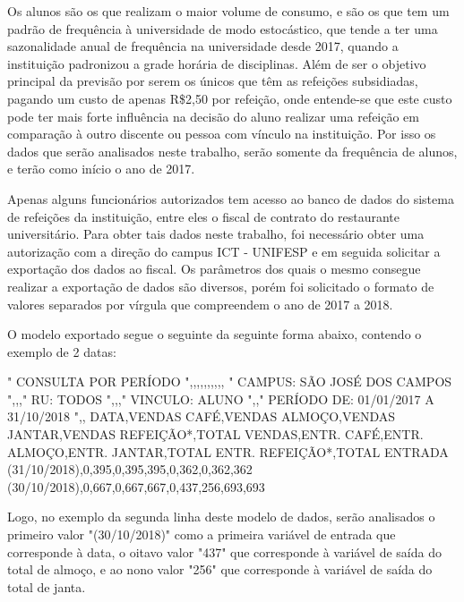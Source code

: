 \documentclass[	12pt, Times, openright, twoside, a4paper, english, brazil]{abntex2}
\begin{document}
          Os alunos são os que realizam o maior volume de consumo, e são os que tem um padrão de frequência à universidade de modo estocástico, que tende a ter uma sazonalidade anual de frequência na universidade desde 2017, quando a instituição padronizou a grade horária de disciplinas.  Além de ser o objetivo principal da previsão por serem os únicos que têm as refeições subsidiadas, pagando um custo de apenas R\$2,50 por refeição, onde entende-se que este custo pode ter mais forte influência na decisão do aluno realizar uma refeição em comparação à outro discente ou pessoa com vínculo na instituição. Por isso os dados que serão analisados neste trabalho, serão somente da frequência de alunos, e terão como início o ano de 2017. 

          Apenas alguns funcionários autorizados tem acesso ao banco de dados do sistema de refeições da instituição, entre eles o fiscal de contrato do restaurante universitário. Para obter tais dados neste trabalho, foi necessário obter uma autorização com a direção do campus ICT - UNIFESP e em seguida solicitar a exportação dos dados ao fiscal. Os parâmetros dos quais o mesmo consegue realizar a exportação de dados são diversos, porém foi solicitado o formato de valores separados por vírgula que compreendem o ano de 2017 a 2018.

          O modelo exportado segue o seguinte da seguinte forma abaixo, contendo o exemplo de 2 datas: 
          \begin{algorithm}[H]
          "
          CONSULTA POR PERÍODO                    ",,,,,,,,,,
          "
          CAMPUS: SÃO JOSÉ DOS CAMPOS                    ",,,"
          RU: TODOS                    ",,,"
          VINCULO: ALUNO                    ",,"
          PERÍODO DE: 01/01/2017 A 31/10/2018                        ",,
          DATA,VENDAS CAFÉ,VENDAS ALMOÇO,VENDAS JANTAR,VENDAS REFEIÇÃO*,TOTAL VENDAS,ENTR. CAFÉ,ENTR. ALMOÇO,ENTR. JANTAR,TOTAL ENTR. REFEIÇÃO*,TOTAL ENTRADA
          (31/10/2018),0,395,0,395,395,0,362,0,362,362
          (30/10/2018),0,667,0,667,667,0,437,256,693,693
          \end{algorithm}

          Logo, no exemplo da segunda linha deste modelo de dados, serão analisados o primeiro valor "(30/10/2018)" como a primeira variável de entrada que corresponde à data, o oitavo valor "437" que corresponde à variável de saída do total de almoço, e ao nono valor "256" que corresponde à variável de saída do total de janta.
\end{document}
